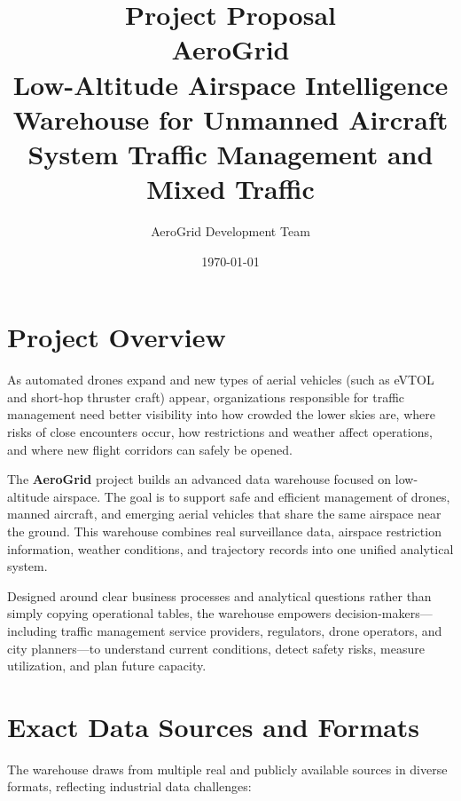 \documentclass[11pt,a4paper]{article}
\title{\textbf{Project Proposal}\\[0.5cm] \textbf{AeroGrid}\\[0.3cm] Low-Altitude Airspace Intelligence Warehouse for Unmanned Aircraft System Traffic Management and Mixed Traffic}
\author{AeroGrid Development Team}
\date{\today}
\begin{document}
\maketitle

\section{Project Overview}
As automated drones expand and new types of aerial vehicles (such as eVTOL and short-hop thruster craft) appear, organizations responsible for traffic management need better visibility into how crowded the lower skies are, where risks of close encounters occur, how restrictions and weather affect operations, and where new flight corridors can safely be opened. 

The \textbf{AeroGrid} project builds an advanced data warehouse focused on low-altitude airspace. The goal is to support safe and efficient management of drones, manned aircraft, and emerging aerial vehicles that share the same airspace near the ground. This warehouse combines real surveillance data, airspace restriction information, weather conditions, and trajectory records into one unified analytical system.

Designed around clear business processes and analytical questions rather than simply copying operational tables, the warehouse empowers decision-makers---including traffic management service providers, regulators, drone operators, and city planners---to understand current conditions, detect safety risks, measure utilization, and plan future capacity.

\section{Exact Data Sources and Formats}
The warehouse draws from multiple real and publicly available sources in diverse formats, reflecting industrial data challenges:
\end{document}
